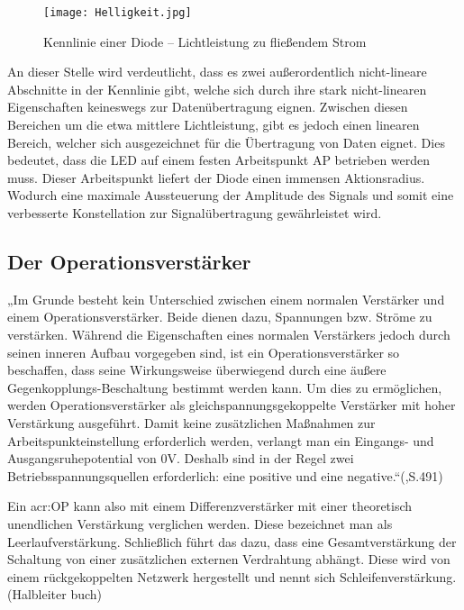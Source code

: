 \begin{figure}[H]
	\centering
	\texttt{[image: Helligkeit.jpg]}
	\caption[Kennlinie einer Diode – Lichtleistung zu fließendem Strom]{Kennlinie einer Diode – Lichtleistung zu fließendem Strom} 
	\cite{Eigen}
	\label{fig:Helligkeit}
\end{figure}

An dieser Stelle wird verdeutlicht, dass es zwei außerordentlich nicht-lineare Abschnitte in der Kennlinie gibt, welche sich durch ihre stark nicht-linearen Eigenschaften keineswegs zur Datenübertragung eignen. Zwischen diesen Bereichen um die etwa mittlere Lichtleistung, gibt es jedoch einen linearen Bereich, welcher sich ausgezeichnet für die Übertragung von Daten eignet. Dies bedeutet, dass die LED auf einem festen Arbeitspunkt AP betrieben werden muss. Dieser Arbeitspunkt liefert der Diode einen immensen Aktionsradius. Wodurch eine maximale Aussteuerung der Amplitude des Signals und somit eine verbesserte Konstellation zur Signalübertragung gewährleistet wird.


\subsection{Der Operationsverstärker}
\label{subsec:Unterabschnitt12}

„Im Grunde besteht kein Unterschied zwischen einem normalen Verstärker und einem Operationsverstärker. Beide dienen dazu, Spannungen bzw. Ströme zu verstärken. Während die Eigenschaften eines normalen Verstärkers jedoch durch seinen inneren Aufbau vorgegeben sind, ist ein Operationsverstärker so beschaffen, dass seine Wirkungsweise überwiegend durch eine äußere Gegenkopplungs-Beschaltung bestimmt werden kann. Um dies zu ermöglichen, werden Operationsverstärker als gleichspannungsgekoppelte Verstärker mit hoher Verstärkung ausgeführt. Damit keine zusätzlichen Maßnahmen zur Arbeitspunkteinstellung erforderlich werden, verlangt man ein Eingangs- und Ausgangsruhepotential von 0V. Deshalb sind in der Regel zwei Betriebsspannungsquellen erforderlich: eine positive und eine negative.“(\cite{tietzeElectronicCircuits2008},S.491)

Ein \gls{acr:OP} kann also mit einem Differenzverstärker mit einer theoretisch unendlichen Verstärkung verglichen werden. Diese bezeichnet man als Leerlaufverstärkung. Schließlich führt das dazu, dass eine Gesamtverstärkung der Schaltung von einer zusätzlichen externen Verdrahtung abhängt. Diese wird von einem rückgekoppelten Netzwerk hergestellt und nennt sich Schleifenverstärkung.(Halbleiter buch) 

